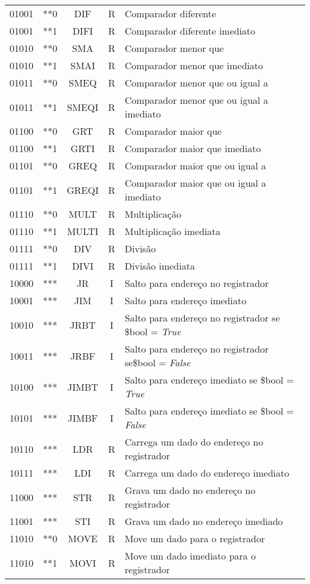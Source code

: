 \documentclass{article}
\begin{document}
\begin{longtable}{c c c c l}
					01001 &	**0 & DIF 	&	R &	Comparador diferente \\
					01001 &	**1 & DIFI 	&	R &	Comparador diferente imediato\\
					01010 &	**0 & SMA 	&	R &	Comparador menor que\\
					01010 &	**1 & SMAI 	&	R &	Comparador menor que imediato\\
					01011 &	**0 & SMEQ 	&	R &	Comparador menor que ou igual a\\
					01011 &	**1 & SMEQI	&	R &	Comparador menor que ou igual a imediato\\
					01100 &	**0 & GRT 	&	R &	Comparador maior que\\
					01100 &	**1 & GRTI 	&	R &	Comparador maior que imediato\\
					01101 &	**0 & GREQ 	&	R &	Comparador maior que ou igual a\\
					01101 &	**1 & GREQI	&	R &	Comparador maior que ou igual a imediato\\
					01110 &	**0 & MULT 	&	R &	Multiplica\c{c}\~{a}o\\
					01110 &	**1 & MULTI	&	R &	Multiplica\c{c}\~{a}o imediata\\
					01111 &	**0 & DIV 	&	R &	Divis\~{a}o\\
					01111 &	**1 & DIVI 	&	R &	Divis\~{a}o imediata\\
					10000 &	*** & JR 	&	I &	Salto para endere\c{c}o no registrador\\
					10001 &	*** & JIM 	&	I &	Salto para endere\c{c}o imediato\\
					10010 &	*** & JRBT 	&	I &	Salto para endere\c{c}o no registrador se \$bool = \textit{True}\\
					10011 &	*** & JRBF 	&	I &	Salto para endere\c{c}o no registrador se\$bool = \textit{False}\\
					10100 &	*** & JIMBT	&	I &	Salto para endere\c{c}o imediato se \$bool = \textit{True}\\
					10101 &	*** & JIMBF	&	I &	Salto para endere\c{c}o imediato se \$bool = \textit{False}\\
					10110 &	*** & LDR 	&	R &	Carrega um dado do endere\c{c}o no registrador\\
					10111 &	*** & LDI 	&	R &	Carrega um dado do endere\c{c}o imediato\\
					11000 &	*** & STR 	&	R &	Grava um dado no endere\c{c}o no registrador\\
					11001 &	*** & STI 	&	R &	Grava um dado no endere\c{c}o imediado\\
					11010 & **0 & MOVE  &	R & Move um dado para o registrador\\
					11010 & **1 & MOVI  &	R & Move um dado imediato para o registrador\\
				\end{longtable}
\end{document}

